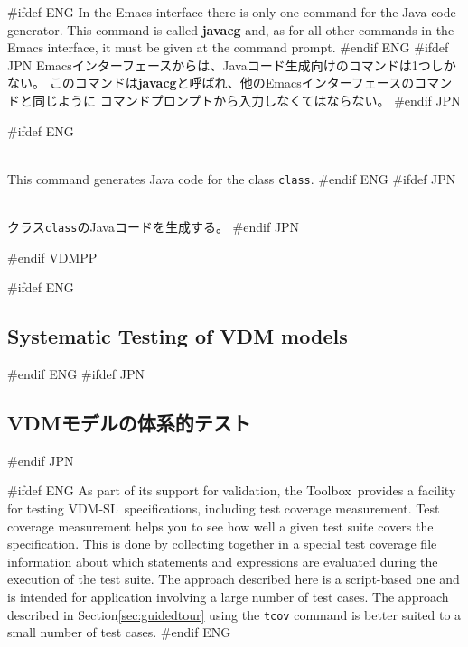 \documentclass[\pformat,12pt]{article}
\newcommand{\vdmslpp}{VDM-SL}
\newcommand{\Toolbox}{Toolbox}
\newcommand{\vdmslpp}{VDM++}
\newcommand{\Toolbox}{Toolbox}
\begin{document}
#ifdef ENG
In the Emacs interface there is only one command for the Java code generator.
This command is called \textbf{javacg}
and, as for all other commands in the Emacs interface, it must be given at
the command prompt.
#endif ENG
#ifdef JPN
Emacsインターフェースからは、Javaコード生成向けのコマンドは1つしかない。
このコマンドは\textbf{javacg}と呼ばれ、他のEmacsインターフェースのコマンドと同じように
コマンドプロンプトから入力しなくてはならない。
#endif JPN

\begin{description}
#ifdef ENG
\item[*javacg (jcg) {\tt class} {[}{\tt options}{]}]   \mbox{}\\
  This command generates Java code for the class {\tt class}.
#endif ENG
#ifdef JPN
\item[*javacg (jcg) {\tt class} {[}{\tt options}{]}] 
  \mbox{}\\
  クラス{\tt class}のJavaコードを生成する。
#endif JPN
\end{description}
#endif VDMPP

\newpage
#ifdef ENG
\subsection{Systematic Testing of VDM models}\label{sec:testing}
\label{vdmtc} 
#endif ENG
#ifdef JPN
\subsection{VDMモデルの体系的テスト}\label{sec:testing}
\label{vdmtc} 
#endif JPN

#ifdef ENG
As part of its support for validation, the \Toolbox\ provides a
facility for testing \vdmslpp\ specifications, including test
  coverage measurement.  Test coverage measurement helps you to see
how well a given test suite covers the
specification. This is done by collecting together in a special 
test coverage file information  about which
statements and expressions are 
evaluated during the execution of the test suite. The approach
described here is a script-based one and is intended for application
involving a large number of test cases. The approach described in
Section\ref{sec:guidedtour} using the \texttt{tcov} command is better
suited to a small number of test cases.
#endif ENG
\end{document}
